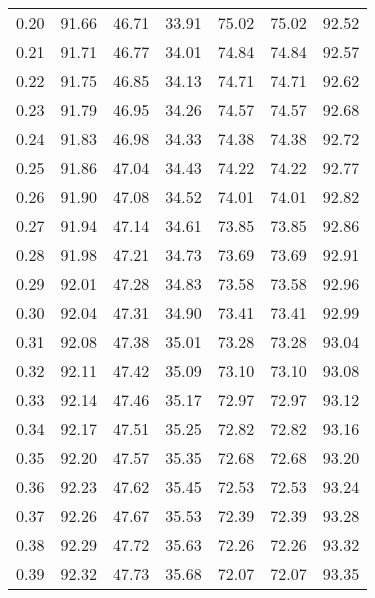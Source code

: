 \begin{tabular}{|c|c|c|c|c|c|c|}
      0.20 &     91.66 &     46.71 &      33.91 &   75.02 &      75.02 &         92.52 \\
      0.21 &     91.71 &     46.77 &      34.01 &   74.84 &      74.84 &         92.57 \\
      0.22 &     91.75 &     46.85 &      34.13 &   74.71 &      74.71 &         92.62 \\
      0.23 &     91.79 &     46.95 &      34.26 &   74.57 &      74.57 &         92.68 \\
      0.24 &     91.83 &     46.98 &      34.33 &   74.38 &      74.38 &         92.72 \\
      0.25 &     91.86 &     47.04 &      34.43 &   74.22 &      74.22 &         92.77 \\
      0.26 &     91.90 &     47.08 &      34.52 &   74.01 &      74.01 &         92.82 \\
      0.27 &     91.94 &     47.14 &      34.61 &   73.85 &      73.85 &         92.86 \\
      0.28 &     91.98 &     47.21 &      34.73 &   73.69 &      73.69 &         92.91 \\
      0.29 &     92.01 &     47.28 &      34.83 &   73.58 &      73.58 &         92.96 \\
      0.30 &     92.04 &     47.31 &      34.90 &   73.41 &      73.41 &         92.99 \\
      0.31 &     92.08 &     47.38 &      35.01 &   73.28 &      73.28 &         93.04 \\
      0.32 &     92.11 &     47.42 &      35.09 &   73.10 &      73.10 &         93.08 \\
      0.33 &     92.14 &     47.46 &      35.17 &   72.97 &      72.97 &         93.12 \\
      0.34 &     92.17 &     47.51 &      35.25 &   72.82 &      72.82 &         93.16 \\
      0.35 &     92.20 &     47.57 &      35.35 &   72.68 &      72.68 &         93.20 \\
      0.36 &     92.23 &     47.62 &      35.45 &   72.53 &      72.53 &         93.24 \\
      0.37 &     92.26 &     47.67 &      35.53 &   72.39 &      72.39 &         93.28 \\
      0.38 &     92.29 &     47.72 &      35.63 &   72.26 &      72.26 &         93.32 \\
      0.39 &     92.32 &     47.73 &      35.68 &   72.07 &      72.07 &         93.35 \\

\end{tabular}

